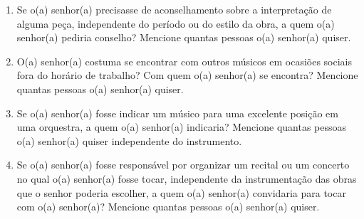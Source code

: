 \documentclass[a4paper, 12pt, openright, oneside, german, french, english, brazil]{abntex2}
\begin{document}
	\begin{enumerate}
		\item Se o(a) senhor(a) precisasse de aconselhamento sobre a interpretação de alguma peça, independente do período ou do estilo da obra, a quem o(a) senhor(a) pediria conselho? Mencione quantas pessoas o(a) senhor(a) quiser.
		\item O(a) senhor(a) costuma se encontrar com outros músicos em ocasiões sociais fora do horário de trabalho? Com quem o(a) senhor(a) se encontra? Mencione quantas pessoas o(a) senhor(a) quiser.
		\item Se o(a) senhor(a) fosse indicar um músico para uma excelente posição em uma orquestra, a quem o(a) senhor(a) indicaria? Mencione quantas pessoas o(a) senhor(a) quiser independente do instrumento.
		\item Se o(a) senhor(a) fosse responsável por organizar um recital ou um concerto no qual o(a) senhor(a) fosse tocar, independente da instrumentação das obras que o senhor poderia escolher, a quem o(a) senhor(a) convidaria para tocar com o(a) senhor(a)? Mencione quantas pessoas o(a) senhor(a) quiser.
	\end{enumerate}




	
	
	
	
\end{document}
